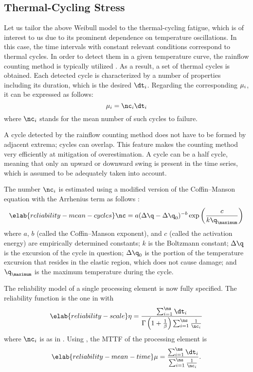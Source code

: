 \subsection{Thermal-Cycling Stress}

Let us tailor the above Weibull model to the thermal-cycling fatigue, which is
of interest to us due to its prominent dependence on temperature oscillations.
In this case, the time intervals with constant relevant conditions correspond to
thermal cycles. In order to detect them in a given temperature curve, the
rainflow counting method is typically utilized \cite{xiang2010}. As a result, a
set of \ns thermal cycles is obtained. Each detected cycle is characterized by a
number of properties including its duration, which is the desired $\dt_i$.
Regarding the corresponding $\mu_i$, it can be expressed as follows:
\[
  \mean_i = \nc_i \dt_i
\]
where $\nc_i$ stands for the mean number of such cycles to failure.

\begin{remark}
A cycle detected by the rainflow counting method does not have to be formed by
adjacent extrema; cycles can overlap. This feature makes the counting method
very efficiently at mitigation of overestimation. A cycle can be a half cycle,
meaning that only an upward or downward swing is present in the time series,
which is assumed to be adequately taken into account.
\end{remark}

The number $\nc_i$ is estimated using a modified version of the Coffin--Manson
equation with the Arrhenius term as follows \cite{xiang2010, jedec2016}:
\begin{equation} \elab{reliability-mean-cycles}
  \nc = a (\Delta \q - \Delta \q_0)^{-b} \exp\left(\frac{c}{k \q_\maximum}\right)
\end{equation}
where $a$, $b$ (called the Coffin--Manson exponent), and $c$ (called the
activation energy) are empirically determined constants; $k$ is the Boltzmann
constant; $\Delta \q$ is the excursion of the cycle in question; $\Delta \q_0$
is the portion of the temperature excursion that resides in the elastic region,
which does not cause damage; and $\q_\maximum$ is the maximum temperature during
the cycle.

The reliability model of a single processing element is now fully specified. The
reliability function is the one in  with
\begin{equation} \elab{reliability-scale}
  \scale = \frac{\sum_{i = 1}^\ns \dt_i}{\Gamma\left(1 + \frac{1}{\shape}\right) \sum_{i = 1}^\ns \frac{1}{\nc_i}}
\end{equation}
where $\nc_i$ is as in . Using
, the \ac{MTTF} of the processing element is
\begin{equation} \elab{reliability-mean-time}
  \mean = \frac{\sum_{i = 1}^\ns \dt_i}{\sum_{i = 1}^\ns \frac{1}{\nc_i}}.
\end{equation}

